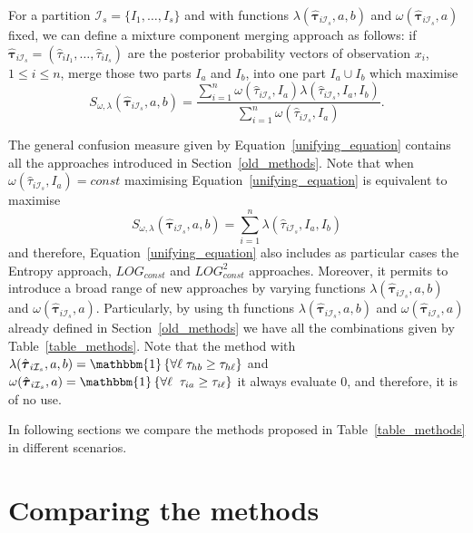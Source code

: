 \documentclass[10pt, a4paper]{article}
\newcommand{\m}[1]{\boldsymbol{#1}}
\begin{document}
For a partition $\mathcal{I}_s = \{ I_1, \dots, I_s\}$ and with  functions $\lambda(\hat{\m \tau}_{i \mathcal{I}_s}, a, b)$ and $\omega(\hat{\m \tau}_{i \mathcal{I}_s}, a)$ fixed, we can define a mixture component merging approach as follows: if $\hat{\m\tau}_{i \mathcal{I}_s} = \left( \hat{\tau}_{i I_1} , \dots, \hat{\tau}_{i I_s}  \right)$ are the posterior probability vectors of observation $x_i$, $1 \leq i \leq n$,  merge those two parts $I_a$ and $I_b$, into one part $I_a \cup I_b$ which maximise
\begin{equation}\label{unifying_equation}
S_{\omega, \lambda}( \hat{\m \tau}_{i \mathcal{I}_s}, a, b) = \frac{\sum_{i=1}^n \omega(\hat{\tau}_{i \mathcal{I}_s}, I_a) \lambda(\hat{\tau}_{i \mathcal{I}_s}, I_a, I_b)}{\sum_{i=1}^n \omega(\hat{\tau}_{i \mathcal{I}_s}, I_a) }.
\end{equation}


The general confusion measure given by Equation~\ref{unifying_equation} contains all the approaches introduced in Section~\ref{old_methods}. Note that when $\omega(\hat{\tau}_{i \mathcal{I}_s}, I_a) = const$ maximising Equation~\ref{unifying_equation} is equivalent to maximise
\[
S_{\omega, \lambda}( \hat{\m \tau}_{i \mathcal{I}_s}, a, b) = \sum_{i=1}^n \lambda(\hat{\tau}_{i \mathcal{I}_s}, I_a, I_b)
\]
and therefore, Equation~\ref{unifying_equation} also includes as particular cases the Entropy approach, $LOG_{const}$ and $LOG^2_{const}$ approaches. Moreover, it permits to introduce a broad range of new approaches by varying functions $\lambda(\hat{\m \tau}_{i \mathcal{I}_s}, a, b)$ and $\omega(\hat{\m \tau}_{i \mathcal{I}_s}, a)$. Particularly, by using th functions $\lambda(\hat{\m \tau}_{i \mathcal{I}_s}, a, b)$ and $\omega(\hat{\m \tau}_{i \mathcal{I}_s}, a)$ already defined in Section~\ref{old_methods} we have all the combinations given by Table~\ref{table_methods}. Note that the method with $\lambda(\hat{\m \tau}_{i \mathcal{I}_s}, a, b) =  \mathlarger{\mathbbm{1}}\left\{  \forall \ell \; \tau_{hb} \geq \tau_{h\ell}  \right\}$ and  $\omega(\hat{\m \tau}_{i \mathcal{I}_s}, a) = \mathlarger{\mathbbm{1}}\left\{  \forall \ell\; \; \tau_{ia} \geq \tau_{i\ell}  \right\}$ it always evaluate 0, and therefore, it is of no use.

In following sections we compare the methods proposed in Table~\ref{table_methods} in different scenarios.

\section{Comparing the methods}
\end{document}
